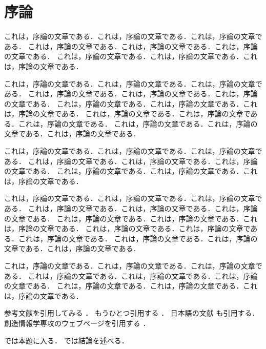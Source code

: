 \chapter{序論} \label{chap:intro}

これは，序論の文章である．これは，序論の文章である．これは，序論の文章である．
これは，序論の文章である．これは，序論の文章である．これは，序論の文章である．
これは，序論の文章である．これは，序論の文章である．これは，序論の文章である．

これは，序論の文章である．これは，序論の文章である．これは，序論の文章である．
これは，序論の文章である．これは，序論の文章である．これは，序論の文章である．
これは，序論の文章である．これは，序論の文章である．これは，序論の文章である．
これは，序論の文章である．これは，序論の文章である．これは，序論の文章である．
これは，序論の文章である．これは，序論の文章である．これは，序論の文章である．

これは，序論の文章である．これは，序論の文章である．これは，序論の文章である．
これは，序論の文章である．これは，序論の文章である．これは，序論の文章である．
これは，序論の文章である．これは，序論の文章である．これは，序論の文章である．

これは，序論の文章である．これは，序論の文章である．これは，序論の文章である．
これは，序論の文章である．これは，序論の文章である．これは，序論の文章である．
これは，序論の文章である．これは，序論の文章である．これは，序論の文章である．
これは，序論の文章である．これは，序論の文章である．これは，序論の文章である．
これは，序論の文章である．これは，序論の文章である．これは，序論の文章である．

これは，序論の文章である．これは，序論の文章である．これは，序論の文章である．
これは，序論の文章である．これは，序論の文章である．これは，序論の文章である．
これは，序論の文章である．これは，序論の文章である．これは，序論の文章である．

参考文献を引用してみる \cite{92795,Knuth86}．
もうひとつ引用する \cite{BollenHHJ07}．
日本語の文献 \cite{Okumura07,ON06} も引用する．
創造情報学専攻のウェブページを引用する \cite{CI08}．

では本題に入る．
では結論を述べる．
